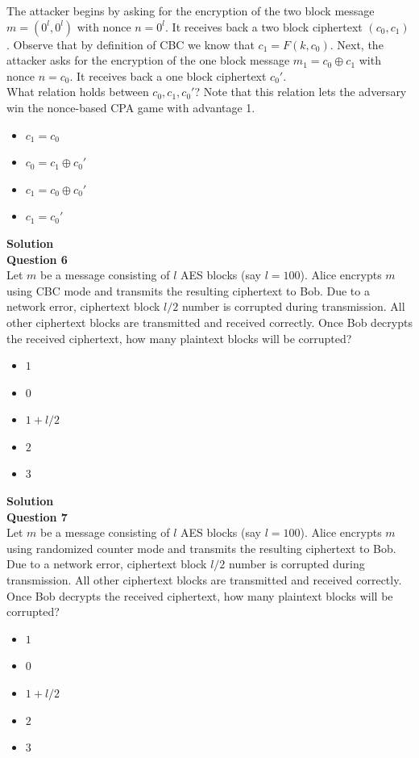 \documentclass[a4paper,12pt]{article}
\begin{document}
The attacker begins by asking for the encryption of the two block message $m=(0^{l},0^{l})$ with nonce $n = 0^{l}$. It receives back a two block ciphertext $(c_{0},c_{1})$. Observe that by definition of CBC we know that $c_{1} = F(k,c_{0})$. Next, the attacker asks for the encryption of the one block message $m_{1} = c_{0} \oplus c_{1}$ with nonce $n = c_{0}$. It receives back a one block ciphertext $c_{0}'$.\\

What relation holds between $c_{0},c_{1},c_{0}'$? Note that this relation lets the adversary win the nonce-based CPA game with advantage 1.
%
\begin{itemize}
\item $c_{1} = c_{0}$
\item $c_{0} = c_{1}\oplus c_{0}'$
\item $c_{1} = c_{0}\oplus c_{0}'$
\item $c_{1} = c_{0}'$
\end{itemize}

\textbf{Solution}\\

\textbf{Question 6} \\

Let $m$ be a message consisting of $l$ AES blocks (say $l = 100$). Alice encrypts $m$ using CBC mode and transmits the resulting ciphertext to Bob. Due to a network error, ciphertext block $l/2$ number is corrupted during transmission. All other ciphertext blocks are transmitted and received correctly. Once Bob decrypts the received ciphertext, how many plaintext blocks will be corrupted?
%
\begin{itemize}
\item $1$
\item $0$
\item $1+ l/2$
\item $2$
\item $3$
\end{itemize}

\textbf{Solution}\\

\textbf{Question 7}\\

Let $m$ be a message consisting of $l$ AES blocks (say $l = 100$). Alice encrypts $m$ using randomized counter mode and transmits the resulting ciphertext to Bob. Due to a network error, ciphertext block $l/2$ number is corrupted during transmission. All other ciphertext blocks are transmitted and received correctly. Once Bob decrypts the received ciphertext, how many plaintext blocks will be corrupted?
%
\begin{itemize}
\item $1$
\item $0$
\item $1+ l/2$
\item $2$
\item $3$
\end{itemize}
\end{document}
